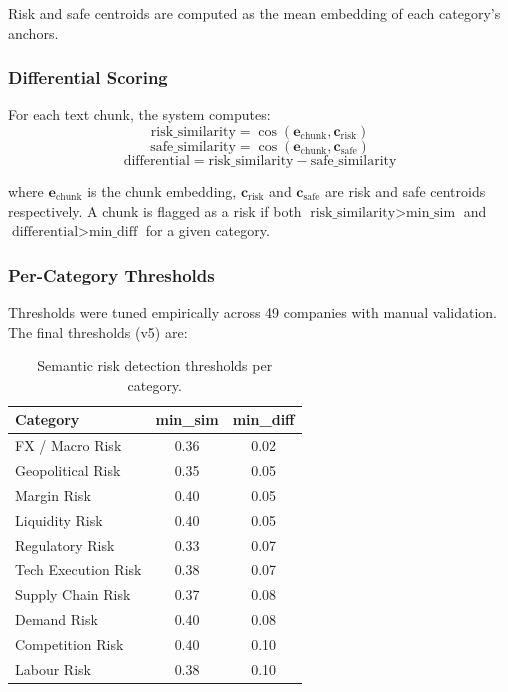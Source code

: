 \documentclass[12pt,a4paper]{article}
\begin{document}
Risk and safe centroids are computed as the mean embedding of each category's anchors.

\subsubsection{Differential Scoring}

For each text chunk, the system computes:
\begin{equation}
    \text{risk\_similarity} = \cos(\mathbf{e}_{\text{chunk}}, \mathbf{c}_{\text{risk}})
    \label{eq:risk-sim}
\end{equation}
\begin{equation}
    \text{safe\_similarity} = \cos(\mathbf{e}_{\text{chunk}}, \mathbf{c}_{\text{safe}})
    \label{eq:safe-sim}
\end{equation}
\begin{equation}
    \text{differential} = \text{risk\_similarity} - \text{safe\_similarity}
    \label{eq:differential}
\end{equation}

where $\mathbf{e}_{\text{chunk}}$ is the chunk embedding, $\mathbf{c}_{\text{risk}}$ and $\mathbf{c}_{\text{safe}}$ are risk and safe centroids respectively. A chunk is flagged as a risk if both $\text{risk\_similarity} > \text{min\_sim}$ and $\text{differential} > \text{min\_diff}$ for a given category.

\subsubsection{Per-Category Thresholds}

Thresholds were tuned empirically across 49 companies with manual validation. The final thresholds (v5) are:

\begin{table}[H]
\centering
\caption{Semantic risk detection thresholds per category.}
\label{tab:semantic-thresholds}
\small
\begin{tabular}{@{}lcc@{}}
\toprule
\textbf{Category} & \textbf{min\_sim} & \textbf{min\_diff} \\
\midrule
FX / Macro Risk & 0.36 & 0.02 \\
Geopolitical Risk & 0.35 & 0.05 \\
Margin Risk & 0.40 & 0.05 \\
Liquidity Risk & 0.40 & 0.05 \\
Regulatory Risk & 0.33 & 0.07 \\
Tech Execution Risk & 0.38 & 0.07 \\
Supply Chain Risk & 0.37 & 0.08 \\
Demand Risk & 0.40 & 0.08 \\
Competition Risk & 0.40 & 0.10 \\
Labour Risk & 0.38 & 0.10 \\
\bottomrule
\end{tabular}
\end{table}
\end{document}
